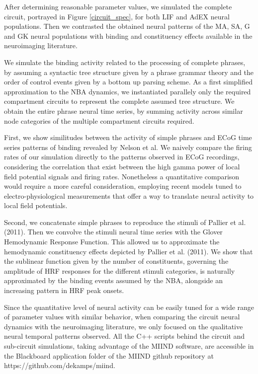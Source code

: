 \documentclass[10pt]{article}
\begin{document}
After determining reasonable parameter values, we simulated the complete circuit, portrayed in Figure \ref{circuit_spec}, for both LIF and AdEX neural populations.
Then we contrasted the obtained neural patterns of the MA, SA, G and GK neural populations with binding and constituency effects available in the neuroimaging literature.

We simulate the binding activity related to the processing of complete phrases, by assuming a syntactic tree structure given by a phrase grammar theory and the order of control events given by a bottom up parsing scheme.
As a first simplified approximation to the NBA dynamics, we instantiated parallely only the required compartment circuits to represent the complete assumed tree structure.
We obtain the entire phrase neural time series, by summing activity across similar node categories of the multiple compartment circuits required.

First, we show similitudes between the activity of simple phrases and ECoG time series patterns of binding revealed by Nelson et al\cite{Nelson_2017}.
We naively compare the firing rates of our simulation directly to the patterns observed in ECoG recordings, considering the correlation that exist between the high gamma power of local field potential signals and firing rates\cite{Ray_2011,Manning_2009}.
Nonetheless a quantitative comparison would require a more careful consideration, employing recent models tuned to electro-physiological measurements that offer a way to translate neural activity to local field potentials\cite{Mazzoni_2015,Hagen_2015}.

Second, we concatenate simple phrases to reproduce the stimuli of Pallier et al.(2011)\cite{Pallier_2011}.
Then we convolve the stimuli neural time series with the Glover Hemodynamic Response Function\cite{Glover_1999}.
This allowed us to approximate the hemodynamic constituency effects depicted by Pallier et al. (2011)\cite{Pallier_2011}.
We show that the sublinear function given by the number of constituents, governing the amplitude of HRF responses for the different stimuli categories, is naturally approximated by the binding events assumed by the NBA, alongside an increasing pattern in HRF peak onsets.

Since the quantitative level of neural activity can be easily tuned for a wide range of parameter values with similar behavior, when comparing the circuit neural dynamics with the neuroimaging literature, we only focused on the qualitative neural temporal patterns observed.
All the C++ scripts behind the circuit and sub-circuit simulations, taking advantage of the MIIND software\cite{de_Kamps_2008}, are accessible in the Blackboard application folder of the MIIND github repository at https://github.com/dekamps/miind.
\end{document}
